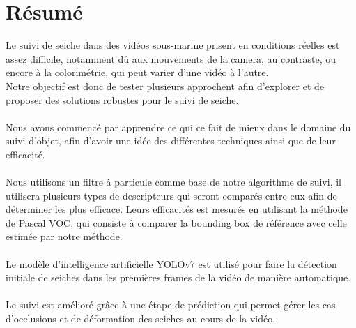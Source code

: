 \chapter*{Résumé}
Le suivi de seiche dans des vidéos sous-marine prisent en conditions réelles est assez difficile, notamment dû aux mouvements de la camera, au contraste, ou encore à la colorimétrie, qui peut varier d'une vidéo à l'autre.\\
Notre objectif est donc de tester plusieurs approchent afin d'explorer et de proposer des solutions robustes pour le suivi de seiche.\\
\\
Nous avons commencé par apprendre ce qui ce fait de mieux dans le domaine du suivi d'objet, afin d'avoir une idée des différentes techniques ainsi que de leur efficacité.\\
\\
Nous utilisons un filtre à particule comme base de notre algorithme de suivi, il utilisera plusieurs types de descripteurs qui seront comparés entre eux afin de déterminer les plus efficace. Leurs efficacités est mesurés en utilisant la méthode de Pascal VOC, qui consiste à comparer la bounding box de référence avec celle estimée par notre méthode.\\
\\
Le modèle d'intelligence artificielle YOLOv7 est utilisé pour faire la détection initiale de seiches dans les premières frames de la vidéo de manière automatique.\\
\\
Le suivi est amélioré grâce à une étape de prédiction qui permet gérer les cas d'occlusions et de déformation des seiches au cours de la vidéo.

\clearpage